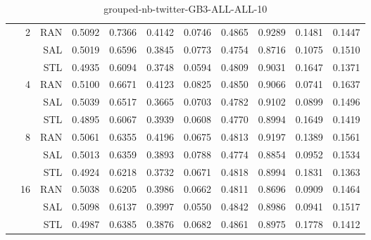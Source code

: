 \begin{center}
\begin{table}[htbp]
\begin{tabular}{ | r | r | r | r | r | r | r | r | r | r | r |}
 & \multirow{3}{*}{2} & RAN & 0.5092 & 0.7366 & 0.4142 & 0.0746 & 0.4865 & 0.9289 & 0.1481 & 0.1447\\ \cline{3-11}
 &   & SAL & 0.5019 & 0.6596 & 0.3845 & 0.0773 & 0.4754 & 0.8716 & 0.1075 & 0.1510\\ \cline{3-11}
 &   & STL & 0.4935 & 0.6094 & 0.3748 & 0.0594 & 0.4809 & 0.9031 & 0.1647 & 0.1371\\ \cline{2-11}
 & \multirow{3}{*}{4} & RAN & 0.5100 & 0.6671 & 0.4123 & 0.0825 & 0.4850 & 0.9066 & 0.0741 & 0.1637\\ \cline{3-11}
 &   & SAL & 0.5039 & 0.6517 & 0.3665 & 0.0703 & 0.4782 & 0.9102 & 0.0899 & 0.1496\\ \cline{3-11}
 &   & STL & 0.4895 & 0.6067 & 0.3939 & 0.0608 & 0.4770 & 0.8994 & 0.1649 & 0.1419\\ \cline{2-11}
 & \multirow{3}{*}{8} & RAN & 0.5061 & 0.6355 & 0.4196 & 0.0675 & 0.4813 & 0.9197 & 0.1389 & 0.1561\\ \cline{3-11}
 &   & SAL & 0.5013 & 0.6359 & 0.3893 & 0.0788 & 0.4774 & 0.8854 & 0.0952 & 0.1534\\ \cline{3-11}
 &   & STL & 0.4924 & 0.6218 & 0.3732 & 0.0671 & 0.4818 & 0.8994 & 0.1831 & 0.1363\\ \cline{2-11}
 & \multirow{3}{*}{16} & RAN & 0.5038 & 0.6205 & 0.3986 & 0.0662 & 0.4811 & 0.8696 & 0.0909 & 0.1464\\ \cline{3-11}
 &   & SAL & 0.5098 & 0.6137 & 0.3997 & 0.0550 & 0.4842 & 0.8986 & 0.0941 & 0.1517\\ \cline{3-11}
 &   & STL & 0.4987 & 0.6385 & 0.3876 & 0.0682 & 0.4861 & 0.8975 & 0.1778 & 0.1412\\ \cline{2-11}
\hline
\end{tabular}
\caption{grouped-nb-twitter-GB3-ALL-ALL-10}
\end{table}
\end{center}

